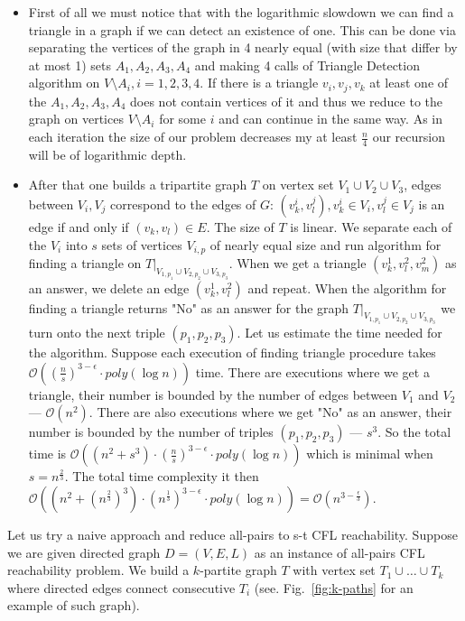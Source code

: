 \documentclass[12pt]{article}
\begin{document}
\begin{itemize}
    \item First of all we must notice that with the logarithmic slowdown we can find a triangle in a graph if we can detect an existence of one. This can be done via separating the vertices of the graph in 4 nearly equal (with size that differ by at most 1) sets $A_1, A_2, A_3, A_4$ and making 4 calls of Triangle Detection algorithm on $V \setminus A_i, i = 1, 2, 3, 4$. If there is a triangle $v_i, v_j, v_k$ at least one of the $A_1, A_2, A_3, A_4$ does not contain vertices of it and thus we reduce to the graph on vertices $V \setminus A_i$ for some $i$ and can continue in the same way. As in each iteration the size of our problem decreases my at least $\frac{n}{4}$ our recursion will be of logarithmic depth. 
    \item After that one builds a tripartite graph $T$ on vertex set $V_1 \cup V_2 \cup V_3$, edges between $V_i, V_j$ correspond to the edges of $G$: $(v^i_k, v^j_l), v^i_k \in V_i, v^j_l \in V_j$ is an edge if and only if $(v_k, v_l) \in E$. The size of $T$ is linear. We separate each of the $V_i$ into $s$ sets of vertices $V_{i, p}$ of nearly equal size and run algorithm for finding a triangle on $T|_{V_{1, p_1} \cup V_{2, p_2} \cup V_{3, p_3}}$. When we get a triangle $(v^1_k, v^2_l, v^2_m)$ as an answer, we delete an edge $(v^1_k, v^2_l)$ and repeat. When the algorithm for finding a triangle returns "No" as an answer for the graph $T|_{V_{1, p_1} \cup V_{2, p_2} \cup V_{3, p_3}}$ we turn onto the next triple $(p_1, p_2, p_3)$. Let us estimate the time needed for the algorithm. Suppose each execution of finding triangle procedure takes $\mathcal{O}((\frac{n}{s})^{3 - \epsilon} \cdot poly(\log n))$ time. There are executions where we get a triangle, their number is bounded by the number of edges between $V_1$ and $V_2$ --- $\mathcal{O}(n^2)$. There are also executions where we get "No" as an answer, their number is bounded by the number of triples $(p_1, p_2, p_3)$ --- $s^3$. So the total time is $\mathcal{O}((n^2 + s^3) \cdot (\frac{n}{s})^{3 - \epsilon} \cdot poly(\log n))$ which is minimal when $s = n^{\frac{2}{3}}$. The total time complexity it then $\mathcal{O}((n^2 + (n^{\frac{2}{3}})^3) \cdot (n^{\frac{1}{3}})^{3 - \epsilon} \cdot poly(\log n)) = \mathcal{O}(n^{3 - \frac{\epsilon}{3}})$.
\end{itemize}

Let us try a naive approach and reduce all-pairs to s-t CFL reachability. Suppose we are given directed graph $D = (V, E, L)$ as an instance of all-pairs CFL reachability problem. We build a $k$-partite graph $T$ with vertex set $T_1 \cup \ldots \cup T_k$ where directed edges connect consecutive $T_i$ (see. Fig.~\ref{fig:k-paths} for an example of such graph).
\end{document}
